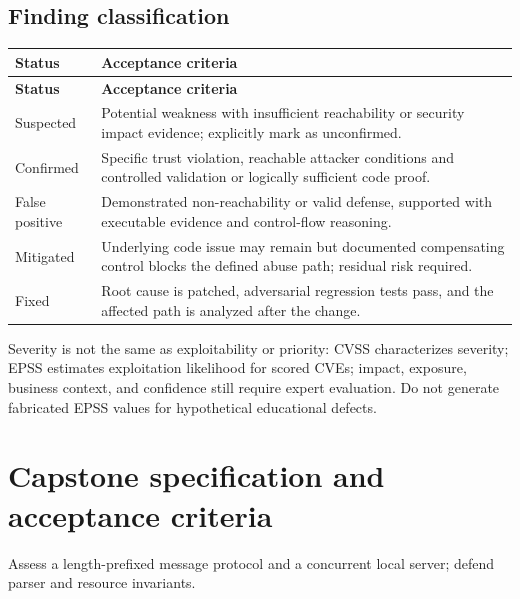 \documentclass[10pt,letterpaper]{article}
\begin{document}
\subsection{Finding classification}
\begingroup\footnotesize\setlength\tabcolsep{3pt}
\begin{longtable}{>{\raggedright\arraybackslash}p{}>{\raggedright\arraybackslash}p{}}\toprule
\textbf{Status} & \textbf{Acceptance criteria}\\\midrule\endfirsthead
\toprule \textbf{Status} & \textbf{Acceptance criteria}\\\midrule\endhead
Suspected & Potential weakness with insufficient reachability or security impact evidence; explicitly mark as unconfirmed.\\\midrule
Confirmed & Specific trust violation, reachable attacker conditions and controlled validation or logically sufficient code proof.\\\midrule
False positive & Demonstrated non-reachability or valid defense, supported with executable evidence and control-flow reasoning.\\\midrule
Mitigated & Underlying code issue may remain but documented compensating control blocks the defined abuse path; residual risk required.\\\midrule
Fixed & Root cause is patched, adversarial regression tests pass, and the affected path is analyzed after the change.\\\midrule
\bottomrule\end{longtable}\endgroup
Severity is not the same as exploitability or priority: CVSS characterizes severity; EPSS estimates exploitation likelihood for scored CVEs; impact, exposure, business context, and confidence still require expert evaluation. Do not generate fabricated EPSS values for hypothetical educational defects.

\section{Capstone specification and acceptance criteria}
Assess a length-prefixed message protocol and a concurrent local server; defend parser and resource invariants.
\end{document}
